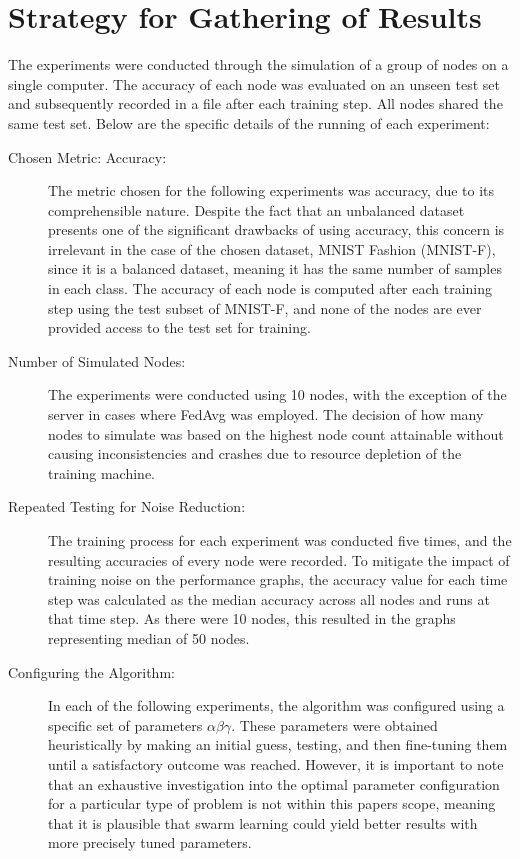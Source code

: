 \documentclass[letterpaper, 10 pt, conference]{ieeeconf}  %
\begin{document}
\section{Strategy for Gathering of Results}
The experiments were conducted through the simulation of a group of nodes on a single computer. The accuracy of each node was evaluated on an unseen test set and subsequently recorded in a file after each training step. All nodes shared the same test set. Below are the specific details of the running of each experiment:
\begin{description}
	\item [Chosen Metric: Accuracy:] The metric chosen for the following experiments was accuracy, due to its comprehensible nature. Despite the fact that an unbalanced dataset presents one of the significant drawbacks of using accuracy, this concern is irrelevant in the case of the chosen dataset, MNIST Fashion (MNIST-F), since it is a balanced dataset, meaning it has the same number of samples in each class. The accuracy of each node is computed after each training step using the test subset of MNIST-F, and none of the nodes are ever provided access to the test set for training.
	
	\item [Number of Simulated Nodes:] The experiments were conducted using 10 nodes, with the exception of the server in cases where FedAvg was employed. The decision of how many nodes to simulate was based on the highest node count attainable without causing inconsistencies and crashes due to resource depletion of the training machine.
	
	\item [Repeated Testing for Noise Reduction:] The training process for each experiment was conducted five times, and the resulting accuracies of every node were recorded. To mitigate the impact of training noise on the performance graphs, the accuracy value for each time step was calculated as the median accuracy across all nodes and runs at that time step. As there were 10 nodes, this resulted in the graphs representing median of 50 nodes.
	
	\item [Configuring the Algorithm:] In each of the following experiments, the algorithm was configured using a specific set of parameters $\alpha \beta \gamma$. These parameters were obtained heuristically by making an initial guess, testing, and then fine-tuning them until a satisfactory outcome was reached. However, it is important to note that an exhaustive investigation into the optimal parameter configuration for a particular type of problem is not within this papers scope, meaning that it is plausible that swarm learning could yield better results with more precisely tuned parameters.
	

\end{description}
\end{document}
